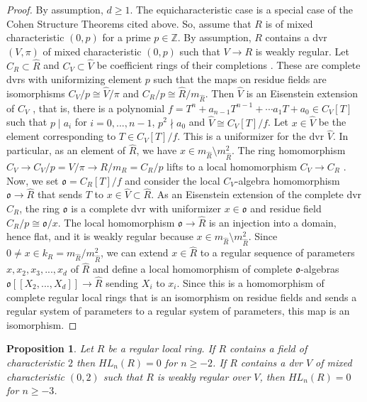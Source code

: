 \documentclass[10pt,twoside,a4paper,reqno]{amsart}
\newtheorem{proposition}[theorem]{Proposition}
\theoremstyle{definition}
\numberwithin{equation}{section}
\newcommand{\Z}{\mathbb{Z}}
\renewcommand{\|}{\operatorname{|}}
\newcommand{\ooo}{\mathfrak{o}}
\begin{document}
\begin{proof}
By assumption, $d\geq 1$.
The equicharacteristic case is a special case of the Cohen Structure Theorems cited above.
So, assume that $R$ is of mixed characteristic $(0,p)$ for a prime $p\in \Z$.
By assumption, $R$ contains a dvr $(V, \pi)$ of mixed characteristic $(0,p)$ such that $V \to R$ is weakly regular.
Let $C_R \subset \hat{R}$ and $C_{V}\subset \hat{V}$ be coefficient rings of their completions \cite[Theorem 29.7]{Matsumura}.
These are complete dvrs with uniformizing element $p$ such that the maps on residue fields are isomorphisms $C_{V}/p \cong \hat{V}/\pi$ and $C_R/p \cong \hat{R}/m_{\hat{R}}$.
Then $\hat{V}$ is an Eisenstein extension of $C_{V}$ \cite[Theorem 29.8]{Matsumura}, that is, there is a polynomial $f = T^n+a_{n-1}T^{n-1} + \cdots a_1T + a_0\in C_{V}[T]$ such that $p\mid a_i$ for $i=0,...,n-1$, $p^2 \nmid a_0$ and $\hat{V}\cong C_V[T]/f$.
Let $x\in \hat{V}$ be the element corresponding to $T\in C_V[T]/f$.
This is a uniformizer for the dvr $\hat{V}$.
In particular, as an element of $\hat{R}$, we have $x \in m_{\hat{R}}\setminus m^2_{\hat{R}}$.
The ring homomorphism $C_{V} \to C_{V}/p  = V/\pi \to R/m_R = C_R/p$ lifts to a local homomorphism $C_{V} \to C_R$ \cite[Theorem 29.2]{Matsumura}.
Now, we set $\ooo=C_R[T]/f$ and consider the local $C_V$-algebra homomorphism $\ooo \to \hat{R}$ that sends $T$ to $x\in \hat{V}\subset \hat{R}$.
As an Eisenstein extension of the complete dvr $C_R$, the ring $\ooo$ is a complete dvr with uniformizer $x\in \ooo$ and residue field $C_R/p\cong \ooo/x$.
The local homomorphism $\ooo \to \hat{R}$ is an injection into a domain, hence flat, and it is weakly regular because $x \in m_{\hat{R}}\setminus m^2_{\hat{R}}$.
Since $0 \neq x \in k_R=m_{\hat{R}}/m^2_{\hat{R}}$, we can extend $x\in \hat{R}$ to a regular sequence of parameters $x,x_2,x_3,...,x_d$ of $\hat{R}$ and define a local homomorphism of complete $\ooo$-algebras $\ooo[[X_2,...,X_d]] \to \hat{R}$ sending $X_i$ to $x_i$.
Since this is a homomorphism of complete regular local rings that is an isomorphism on residue fields and sends a regular system of parameters to a regular system of parameters, this map is an isomorphism.
\end{proof}

\begin{proposition}
\label{prop:LocalL}
Let $R$ be a regular local ring.
If $R$ contains a field of characteristic $2$ then $HL_n(R)=0$ for $n\geq -2$.
If $R$ contains a dvr $V$ of mixed characteristic $(0,2)$ such that $R$ is weakly regular over $V$, then
$HL_n(R)=0$ for $n\geq -3$.
\end{proposition}
\end{document}
